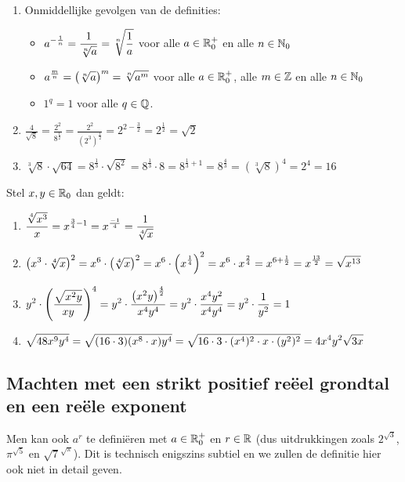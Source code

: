 \documentclass{ximera}
\begin{document}
\begin{example} \ 
	
	\begin{enumerate}
	\item  Onmiddellijke gevolgen van de definities:
	\begin{itemize}
		\item $\displaystyle a^{-\frac{1}{n}}=\frac{1}{\sqrt[n]{a}}=\sqrt[n]{\frac{1}{a}}$ voor alle $a\in\mathbb{R}_0^+$ en alle $n\in\mathbb{N}_0$
		\item $\displaystyle a^{\frac{m}{n}}=\left(\sqrt[n]{a}\right)^m=\sqrt[n]{a^m}$ voor alle $a\in\mathbb{R}_0^+$, alle $m\in\mathbb{Z}$ en alle $n\in\mathbb{N}_0$
		\item $1^q=1$ voor alle $q\in\mathbb{Q}$.
	\end{itemize}

	\item $\frac{4}{\sqrt{8}}=\frac{2^{2}}{8^{\frac{1}{2}}}=\frac{2^{2}}{(2^{3})^{\frac{1}{2}}}=2^{2-\frac{3}{2}}=
	2^{\frac{1}{2}}=\sqrt{2}$
	\item
$\sqrt[3]{8} \cdot \sqrt{64}=8^{\frac{1}{3}}\cdot \sqrt{8^{2}}=8^{\frac{1}{3}}\cdot8=8^{\frac{1}{3}+1}=8^{\frac{4}{3}}=(\sqrt[3]{8})^4=2^4=16$
\end{enumerate}
	Stel $x,y \in \mathbb{R}_0$ dan geldt:
\begin{enumerate}[resume]
	\item
	$\displaystyle{\frac{\sqrt[4]{x^{3}}}{x}=x^{\frac{3}{4}-1}=x^{\frac{-1}{4}}=\frac{1}{\sqrt[4]{x}}}$
	\item
	$\displaystyle{\left(x^{3}\cdot \sqrt[4]{x}\right)^{2}=x^{6}\cdot \left(\sqrt[4]{x}\right)^{2}=x^{6}\cdot \left(x^{\frac{1}{4}}\right)^{2}=x^{6}\cdot x^{\frac{2}{4}}=
		x^{6+\frac{1}{2}}=x^{\frac{13}{2}}=\sqrt{x^{13}}}$
	\item
	$\displaystyle{y^{2} \cdot \left(\frac{\sqrt{x^{2}y}}{xy}\right)^{4}=y^{2} \cdot \frac{\left(x^{2}y\right)^{\frac{4}{2}}}{x^{4}y^{4}}=y^{2}\cdot \frac{x^{4}y^{2}}{x^{4}y^{4}}
		=y^{2} \cdot \frac{1}{y^{2}}=1}$
	\item
	$\displaystyle{\sqrt{48 x^{9}y^{4}}=\sqrt{(16 \cdot 3)(x^{8} \cdot
			x)y^{4}}=\sqrt{16 \cdot 3\cdot (x^{4})^{2}\cdot x\cdot
			(y^{2})^{2}}=4 x^{4}y^{2}\sqrt{3x}}$
	
\end{enumerate}
\end{example}
\subsection*{Machten met een strikt positief re\"eel grondtal en een re\"ele exponent}\label{machten-r}
Men kan ook $a^r$ te definiëren met $a\in\mathbb{R}_0^+$
en $r\in\mathbb{R}$ (dus uitdrukkingen zoals $2^{\sqrt{3}}$, $\pi^{\sqrt{5}}$ en $\sqrt{7}^{\sqrt{\pi}}$). Dit is technisch enigszins subtiel en we zullen de definitie hier
ook niet in detail geven. 
\end{document}
